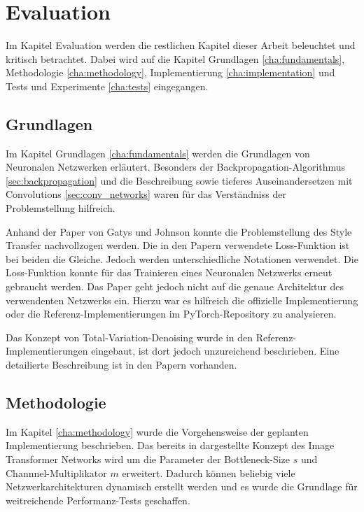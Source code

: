 \chapter{Evaluation}

Im Kapitel Evaluation werden die restlichen Kapitel dieser Arbeit beleuchtet und kritisch betrachtet. Dabei wird auf die Kapitel Grundlagen \ref{cha:fundamentals}, Methodologie \ref{cha:methodology}, Implementierung \ref{cha:implementation} und Tests und Experimente \ref{cha:tests} eingegangen.

\section{Grundlagen}

Im Kapitel Grundlagen \ref{cha:fundamentals} werden die Grundlagen von Neuronalen Netzwerken erläutert. Besonders der Backpropagation-Algorithmus \ref{sec:backpropagation} und die Beschreibung sowie tieferes Auseinandersetzen mit Convolutions \ref{sec:conv_networks} waren für das Verständniss der Problemstellung hilfreich.

Anhand der Paper von Gatys \cite{DBLP:journals/corr/GatysEB15a} und Johnson \cite{DBLP:journals/corr/JohnsonAL16} konnte die Problemstellung des Style Transfer nachvollzogen werden. Die in den Papern verwendete Loss-Funktion ist bei beiden die Gleiche. Jedoch werden unterschiedliche Notationen verwendet. Die Loss-Funktion konnte für das Trainieren eines Neuronalen Netzwerks erneut gebraucht werden. Das Paper \cite{DBLP:journals/corr/JohnsonAL16} geht jedoch nicht auf die genaue Architektur des verwendenten Netzwerks ein. Hierzu war es hilfreich die offizielle Implementierung \cite{Johnson2016} oder die Referenz-Implementierungen im PyTorch-Repository \cite{OnlineToturialNeuralStylePyTorch} zu analysieren.

Das Konzept von Total-Variation-Denoising wurde in den Referenz-Implementierungen eingebaut, ist dort jedoch unzureichend beschrieben. Eine detailierte Beschreibung ist in den Papern \cite{RUDIN1992259, DBLP:journals/corr/EstrelaMS16} vorhanden.

\section{Methodologie}

Im Kapitel \ref{cha:methodology} wurde die Vorgehensweise der geplanten Implementierung beschrieben. Das bereits in \cite{DBLP:journals/corr/JohnsonAL16} dargestellte Konzept des Image Transformer Networks wird um die Parameter der Bottleneck-Size $ s $ und Channnel-Multiplikator $ m $ erweitert. Dadurch können beliebig viele Netzwerkarchitekturen dynamisch erstellt werden und es wurde die Grundlage für weitreichende Performanz-Tests geschaffen.

